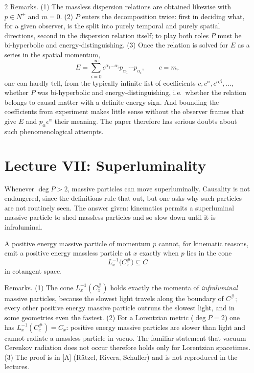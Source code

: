 \begin{paracol}{2}
Remarks. (1) The massless dispersion relations are obtained likewise with $p\in N^+$ and $m=0$. (2) $P$ enters the decomposition twice: first in deciding what, for a given observer, is the split into purely temporal and purely spatial directions, second in the dispersion relation itself; to play both roles $P$ must be bi-hyperbolic and energy-distinguishing. (3) Once the relation is solved for $E$ as a series in the spatial momentum,
\[
  E=\sum_{i=0}^\infty c^{\alpha_1\dots\alpha_i}p_{\alpha_1}\cdots p_{\alpha_i},\qquad c=m,
\]
one can hardly tell, from the typically infinite list of coefficients $c,c^\alpha,c^{\alpha\beta},\dots$, whether $P$ was bi-hyperbolic and energy-distinguishing, i.e.\ whether the relation belongs to causal matter with a definite energy sign. And bounding the coefficients from experiment makes little sense without the observer frames that give $E$ and $p_\alpha\epsilon^\alpha$ their meaning. The paper therefore has serious doubts about such phenomenological attempts.

\section{Lecture VII: Superluminality}\label{sec:c29-L7}

 Whenever $\deg P>2$, massive particles can move superluminally. Causality is not endangered, since the definitions rule that out, but one asks why such particles are not routinely seen. The answer given: kinematics permits a superluminal massive particle to shed massless particles and so slow down until it is infraluminal.

\begin{theorem}\label{thm:c29-cerenkov}
A positive energy massive particle of momentum $p$ cannot, for kinematic reasons, emit a positive energy massless particle at $x$ exactly when $p$ lies in the cone
\[
  L_x^{-1}\bigl(C^\#_x\bigr)\subseteq C
\]
in cotangent space.
\end{theorem}

Remarks. (1) The cone $L^{-1}_x(C^\#_x)$ holds exactly the momenta of \emph{infraluminal} massive particles, because the slowest light travels along the boundary of $C^\#$; every other positive energy massive particle outruns the slowest light, and in some geometries even the fastest. (2) For a Lorentzian metric ($\deg P=2$) one has $L^{-1}_x(C^\#_x)=C_x$: positive energy massive particles are slower than light and cannot radiate a massless particle in vacuo. The familiar statement that vacuum Cerenkov radiation does not occur therefore holds only for Lorentzian spacetimes. (3) The proof is in [A] (R\"atzel, Rivera, Schuller) and is not reproduced in the lectures.


\end{paracol}
